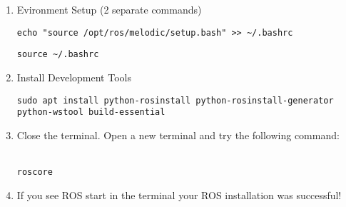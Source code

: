 \documentclass[12pt]{article}
\begin{document}
\begin{enumerate}
\newpage
\item Evironment Setup (2 separate commands) 
\begin{verbatim} 
echo "source /opt/ros/melodic/setup.bash" >> ~/.bashrc
\end{verbatim}
\begin{verbatim} 
source ~/.bashrc 
\end{verbatim}
		
\item Install Development Tools 
\begin{verbatim} 
sudo apt install python-rosinstall python-rosinstall-generator python-wstool build-essential
\end{verbatim}

		\item Close the terminal. Open a new terminal and try the following command:\\\\
\begin{verbatim}  
roscore 
\end{verbatim}

		\item If you see ROS start in the terminal your ROS installation was successful!\\\\

\end{enumerate}
\end{document}
